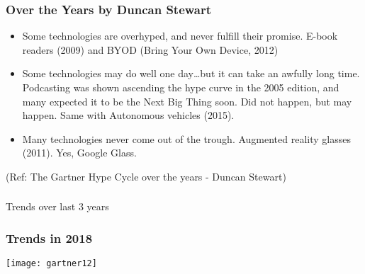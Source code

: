 \begin{frame}[fragile]\frametitle{Over the Years by Duncan Stewart}


\begin{itemize}
\item Some technologies are overhyped, and never fulfill their promise. E-book readers (2009) and BYOD (Bring Your Own Device, 2012)

\item Some technologies may do well one day…but it can take an awfully long time. Podcasting was shown ascending the hype curve in the 2005 edition, and many expected it to be the Next Big Thing soon. Did not happen, but may happen. Same with Autonomous vehicles (2015).

\item Many technologies never come out of the trough. Augmented reality glasses (2011). Yes, Google Glass.

\end{itemize}

{\tiny (Ref: The Gartner Hype Cycle over the years - Duncan Stewart)}


\end{frame}



\begin{frame}[fragile]\frametitle{}
\begin{center}
{\Large Trends over last 3 years}
\end{center}
\end{frame}


\begin{frame}[fragile]\frametitle{Trends in 2018}

\begin{center}
\texttt{[image: gartner12]}
\end{center}


\end{frame}

